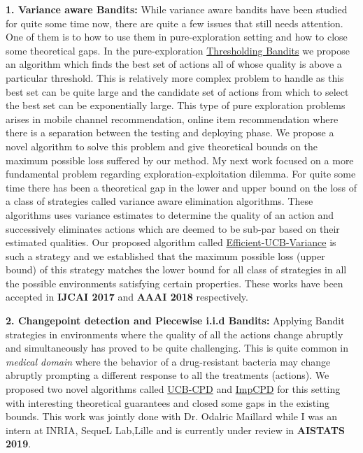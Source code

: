 \documentclass[twoside]{article}
\begin{document}
\textbf{1. Variance aware Bandits:} While variance aware bandits have been studied for quite some time now, there are quite a few issues that still needs attention. One of them is to how to use them in pure-exploration setting and how to close some theoretical gaps. In the pure-exploration \href{https://www.ijcai.org/proceedings/2017/0350.pdf}{Thresholding Bandits} \citep{mukherjee2016} we propose an algorithm which finds the best set of actions all of whose quality is above a particular threshold. This is relatively more complex problem to handle as this best set can be quite large and the candidate set of actions from which to select the best set can be exponentially large. This type of pure exploration problems arises in mobile channel recommendation, online item recommendation where there is a separation between the testing and deploying phase. We propose a novel algorithm to solve this problem and give theoretical bounds on the maximum possible loss suffered by our method. My next work focused on a more fundamental problem regarding exploration-exploitation dilemma. For quite some time there has been a theoretical gap in the lower and upper bound on the loss of a class of strategies called variance aware elimination algorithms. These algorithms uses variance estimates to determine the quality of an action and successively eliminates actions which are deemed to be sub-par based on their estimated qualities. Our proposed algorithm called \href{https://www.aaai.org/ocs/index.php/AAAI/AAAI18/paper/view/16111}{Efficient-UCB-Variance} \citep{mukherjee2018} is such a strategy and we established that the maximum possible loss (upper bound) of this strategy matches the lower bound for all class of strategies in all the possible environments satisfying certain properties. These works have been accepted in \textbf{IJCAI 2017} and \textbf{AAAI 2018} respectively.

\textbf{2. Changepoint detection and Piecewise i.i.d Bandits:}  Applying Bandit strategies in environments where the quality of all the actions change abruptly and simultaneously has proved to be quite challenging. This is quite common in \textit{medical domain} where the behavior of a drug-resistant bacteria may change abruptly prompting a different response to all the treatments (actions). We proposed two novel algorithms called \href{https://subhojyoti.github.io/pdf/aistats_2019.pdf}{UCB-CPD} and \href{https://subhojyoti.github.io/pdf/aistats_2019.pdf}{ImpCPD} for this setting with interesting theoretical guarantees and closed some gaps in the existing bounds. This work was jointly done with Dr. Odalric Maillard while I was an intern at INRIA, SequeL Lab,Lille and is currently under review in \textbf{AISTATS 2019}. 
\end{document}
